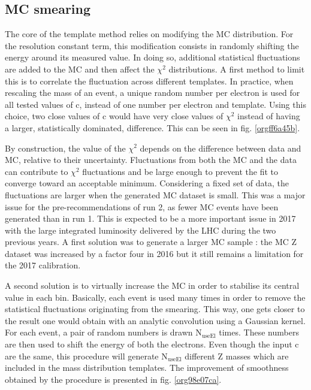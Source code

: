 \subsection{MC smearing}
\label{sec:org5d87ec9}
\label{sec:Calibration_inSitu_nUseEl}

The core of the template method relies on modifying the MC distribution.
For the resolution constant term, this modification consists in randomly shifting the energy around its measured value.
In doing so, additional statistical fluctuations are added to the MC and then affect the $\chi^2$ distributions.
A first method to limit this is to correlate the fluctuation across different templates.
In practice, when rescaling the mass of an event, a unique random number per electron is used for all tested values of c, instead of one number per electron and template.
Using this choice, two close values of c would have very close values of $\chi^2$ instead of having a larger, statistically dominated, difference.
This can be seen in fig. \ref{orgff6a45b}.


By construction, the value of the $\chi^2$ depends on the difference between data and MC, relative to their uncertainty.
Fluctuations from both the MC and the data can contribute to $\chi^2$ fluctuations and be large enough to prevent the fit to converge toward an acceptable minimum.
Considering a fixed set of data, the fluctuations are larger when the generated MC dataset is small.
This was a major issue for the pre-recommendations of run 2, as fewer MC events have been generated than in run 1.
This is expected to be a more important issue in 2017 with the large integrated luminosity delivered by the LHC during the two previous years.
A first solution was to generate a larger MC sample : the MC Z dataset was increased by a factor four in 2016 but it still remains a limitation for the 2017 calibration.

A second solution is to virtually increase the MC in order to stabilise its central value in each bin.
Basically, each event is used many times in order to remove the statistical fluctuations originating from the smearing.
This way, one gets closer to the result one would obtain with an analytic convolution using a Gaussian kernel.
For each event, a pair of random numbers is drawn N\(_{\text{useEl}}\) times.
These numbers are then used to shift the energy of both the electrons.
Even though the input c are the same, this procedure will generate N\(_{\text{useEl}}\) different Z masses which are included in the mass distribution templates.
The improvement of smoothness obtained by the procedure is presented in fig. \ref{org98e07ca}.


